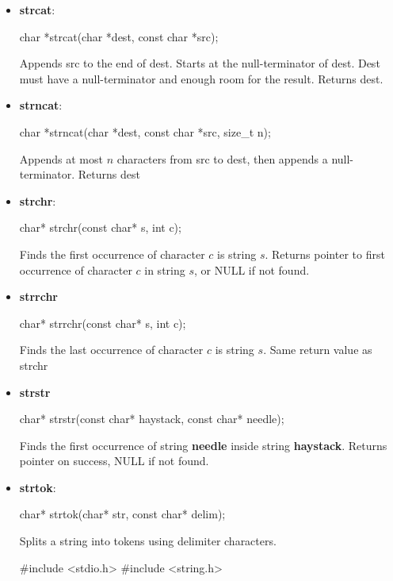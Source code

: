 \documentclass{report}
\begin{document}
\begin{itemize}
\begin{cppcode}
{                    return 0;
                }
            \end{cppcode}
        \item \textbf{strcat}: 
            \bigbreak \noindent 
            \begin{cppcode}
            char *strcat(char *dest, const char *src);
            \end{cppcode}
            \bigbreak \noindent 
            Appends src to the end of dest. Starts at the null-terminator of dest. Dest must have a null-terminator and enough room for the result.
            \bigbreak \noindent 
            Returns dest.
        \item \textbf{strncat}: 
            \bigbreak \noindent 
            \begin{cppcode}
            char *strncat(char *dest, const char *src, size_t n);
            \end{cppcode}
            \bigbreak \noindent 
            Appends at most $n$ characters from src to dest, then appends a null-terminator.
            \bigbreak \noindent 
            Returns dest
        \item \textbf{strchr}: 
            \bigbreak \noindent 
            \begin{cppcode}
            char* strchr(const char* s, int c);
            \end{cppcode}
            \bigbreak \noindent 
            Finds the first occurrence of character $c$ is string $s$.
            \bigbreak \noindent 
            Returns pointer to first occurrence of character $c$ in string $s$, or NULL if not found.
        \item \textbf{strrchr}
            \bigbreak \noindent 
            \begin{cppcode}
            char* strrchr(const char* s, int c);
            \end{cppcode}
            \bigbreak \noindent 
            Finds the last occurrence of character $c$ is string $s$. 
            \bigbreak \noindent 
            Same return value as strchr
        \item \textbf{strstr}
            \bigbreak \noindent 
            \begin{cppcode}
            char* strstr(const char* haystack, const char* needle);
            \end{cppcode}
            \bigbreak \noindent 
            Finds the first occurrence of string \textbf{needle} inside string \textbf{haystack}.
            \bigbreak \noindent 
            Returns pointer on success, NULL if not found.
        \item \textbf{strtok}: 
            \bigbreak \noindent 
            \begin{cppcode}
            char* strtok(char* str, const char* delim);
            \end{cppcode}
            \bigbreak \noindent 
            Splits a string into tokens using delimiter characters.
            \bigbreak \noindent 
            \begin{cppcode}
                #include <stdio.h>
                #include <string.h>


\end{cppcode}
\end{itemize}
\end{document}
